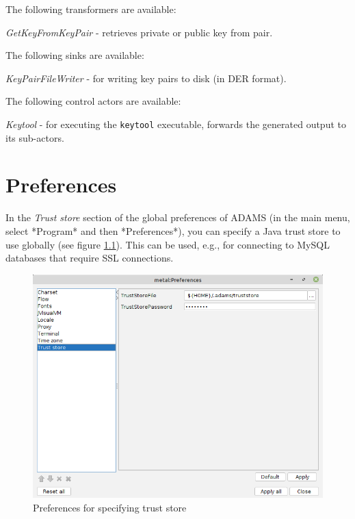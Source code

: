 \documentclass[a4paper]{book}
\begin{document}
\noindent The following transformers are available:
\begin{tight_itemize}
  \item \textit{GetKeyFromKeyPair} - retrieves private or public key from pair.
\end{tight_itemize}

\noindent The following sinks are available:
\begin{tight_itemize}
  \item \textit{KeyPairFileWriter} - for writing key pairs to disk (in DER format).
\end{tight_itemize}

\noindent The following control actors are available:
\begin{tight_itemize}
  \item \textit{Keytool} - for executing the \verb|keytool| executable, forwards
  the generated output to its sub-actors.
\end{tight_itemize}


\chapter{Preferences}
In the \textit{Trust store} section of the global preferences of ADAMS (in the main menu,
select *Program* and then *Preferences*), you can specify a Java trust store to use
globally (see figure \ref{preferences_truststore}). This can be used, e.g., for connecting
to MySQL databases that require SSL connections.
\begin{figure}[htb]
  \centering
  \includegraphics[width=12.0cm]{images/preferences_truststore.png}
  \caption{Preferences for specifying trust store}
  \label{preferences_truststore}
\end{figure}



\end{document}
